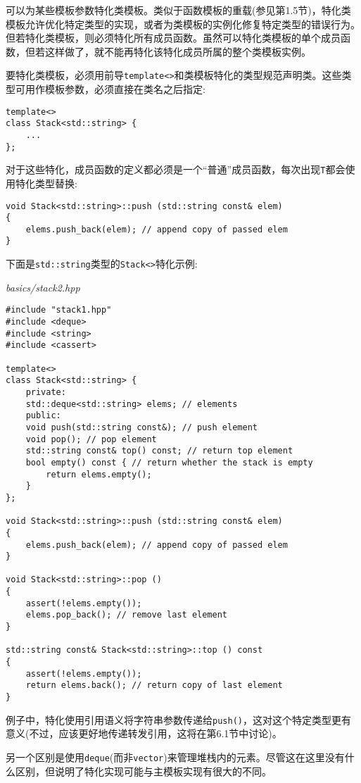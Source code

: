 可以为某些模板参数特化类模板。类似于函数模板的重载(参见第1.5节)，特化类模板允许优化特定类型的实现，或者为类模板的实例化修复特定类型的错误行为。但若特化类模板，则必须特化所有成员函数。虽然可以特化类模板的单个成员函数，但若这样做了，就不能再特化该特化成员所属的整个类模板实例。

要特化类模板，必须用前导\texttt{template<>}和类模板特化的类型规范声明类。这些类型可用作模板参数，必须直接在类名之后指定:

\begin{lstlisting}[style=styleCXX]
template<>
class Stack<std::string> {
	...
};
\end{lstlisting}

对于这些特化，成员函数的定义都必须是一个“普通”成员函数，每次出现\texttt{T}都会使用特化类型替换:

\begin{lstlisting}[style=styleCXX]
void Stack<std::string>::push (std::string const& elem)
{
	elems.push_back(elem); // append copy of passed elem
}
\end{lstlisting}

下面是\texttt{std::string}类型的\texttt{Stack<>}特化示例:

\noindent
\textit{basics/stack2.hpp}
\begin{lstlisting}[style=styleCXX]
#include "stack1.hpp"
#include <deque>
#include <string>
#include <cassert>

template<>
class Stack<std::string> {
	private:
	std::deque<std::string> elems; // elements
	public:
	void push(std::string const&); // push element
	void pop(); // pop element
	std::string const& top() const; // return top element
	bool empty() const { // return whether the stack is empty
		return elems.empty();
	}
};

void Stack<std::string>::push (std::string const& elem)
{
	elems.push_back(elem); // append copy of passed elem
}

void Stack<std::string>::pop ()
{
	assert(!elems.empty());
	elems.pop_back(); // remove last element
}

std::string const& Stack<std::string>::top () const
{
	assert(!elems.empty());
	return elems.back(); // return copy of last element
}
\end{lstlisting}

例子中，特化使用引用语义将字符串参数传递给\texttt{push()}，这对这个特定类型更有意义(不过，应该更好地传递转发引用，这将在第6.1节中讨论)。

另一个区别是使用\texttt{deque}(而非\texttt{vector})来管理堆栈内的元素。尽管这在这里没有什么区别，但说明了特化实现可能与主模板实现有很大的不同。





















